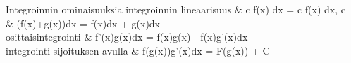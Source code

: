 \begin{eqtable}{Integroinnin ominaisuuksia}
integroinnin lineaarisuus \cite[(1.10)]{MAT-01360}		& \int c f(x) dx = c \int f(x) dx, \quad c \in {} \\
														& \int (f(x)+g(x))dx = \int f(x)dx + \int g(x)dx \\
osittaisintegrointi \cite[(1.13)]{MAT-01360}			& \int f'(x)g(x)dx = f(x)g(x) - \int f(x)g'(x)dx \egrointi sijoituksen avulla \cite[(1.18)]{MAT-01360}	& \int f(g(x))g'(x)dx = F(g(x)) + C \\
\end{eqtable}

\iffalse
Integroimiskaavoja \cite[s.42]{MAOL}
\begin{align*}
& \int 0 dx = C \\
& \int kdx = kx + C \\
& \int f'(x)(f(x))^n dx = \frac{(f(x))^{n+1}}{n+1} + C, \quad n \neq -1 \\
& \int \frac{f'(x)}{f(x)} dx = \ln |f(x)| + C, \quad f(x) \neq 0 \\
& \int \sin x dx = - \cos x + C \\
& \int \cos x dx = sin x + C \\
& \int \tan x dx = - \ln | \cos x | + C \\
& \int e^x dx = e^x + C \\
& \int f'(x)e^{f(x)} dx = e^{f(x)} + C \\
& \int a^x dx = \frac{a^x}{\ln a} + C, \quad a>0, a \neq 1 \\
& \log_a |x| dx = (log_a e)(x \ln |x| - x) + C, \quad a>0, a \neq 1 \\
& \int \frac{dx}{1+x^2} = \arctan x + C \\
& \int \frac{dx}{\sqrt{1-x^2}} = \arcsin x + C
\end{align*}
\fi

